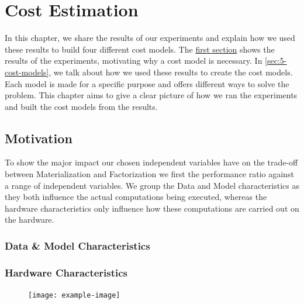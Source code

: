 
\chapter{Cost Estimation}

\label{chapter:cost-estimation}
In this chapter, we share the results of our experiments and explain how we used these results to build four different cost models. The \hyperref[sec:5-motivation]{first section} shows the results of the experiments, motivating why a cost model is necessary. In \autoref{sec:5-cost-models}, we talk about how we used these results to create the cost models. Each model is made for a specific purpose and offers different ways to solve the problem. This chapter aims to give a clear picture of how we ran the experiments and built the cost models from the results.

\section{Motivation}
\label{sec:5-motivation}
To show the major impact our chosen independent variables have on the trade-off between Materialization and Factorization we first the performance ratio against a range of independent variables. We group the Data and Model characteristics as they both influence the actual computations being executed, whereas the hardware characteristics only influence how these computations are carried out on the hardware.

\subsection{Data \& Model Characteristics}


\subsection{Hardware Characteristics}

\begin{figure}[ht]
    \centering
    \texttt{[image: example-image]}
    \caption{}
    \label{fig:5-cpu-parallelism}
\end{figure}


